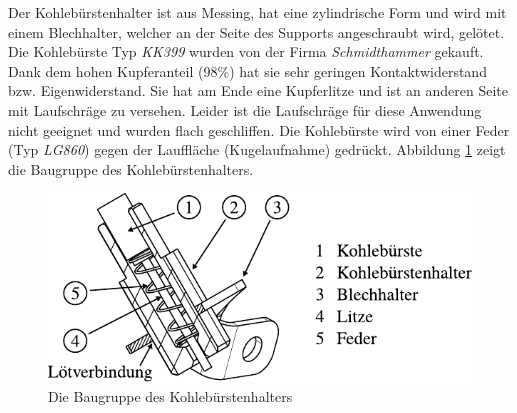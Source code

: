 Der Kohlebürstenhalter ist aus Messing, hat eine zylindrische Form und wird mit einem Blechhalter, welcher an der Seite des Supports angeschraubt wird, gelötet.
Die Kohlebürste Typ \textit{KK399} wurden von der Firma \textit{Schmidthammer} gekauft.
Dank dem hohen Kupferanteil (98\%) hat sie sehr geringen Kontaktwiderstand bzw. Eigenwiderstand.
Sie hat am Ende eine Kupferlitze und ist an anderen Seite mit Laufschräge zu versehen.
Leider ist die Laufschräge für diese Anwendung nicht geeignet und wurden flach geschliffen.
Die Kohlebürste wird von einer Feder (Typ \textit{LG860}) gegen der Lauffläche (Kugelaufnahme) gedrückt.
Abbildung \ref{fig:die_baugruppe_des_kohlebuerstenhalters} zeigt die Baugruppe des Kohlebürstenhalters.
\begin{figure}[htb]
    \centering
    \includegraphics[]{./images/kohlebuerstenhalter_asm.pdf}
    \caption{Die Baugruppe des Kohlebürstenhalters}
    \label{fig:die_baugruppe_des_kohlebuerstenhalters}
\end{figure}
%

